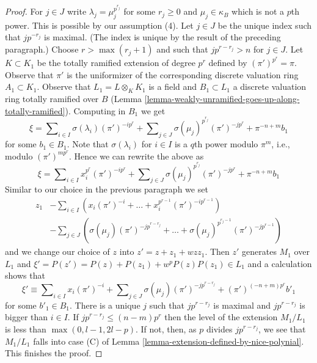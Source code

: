 \begin{proof}
\medskip\noindent
For $j \in J$ write $\lambda_j = \mu_j^{p^{r_j}}$ for some $r_j \geq 0$ and
$\mu_j \in \kappa_B$ which is not a $p$th power. This is possible by our
assumption (4). Let $j \in J$ be the unique index such that $j p^{-r_j}$
is maximal. (The index is unique by the result of the preceding paragraph.)
Choose $r > \max(r_j + 1)$ and such that $j p^{r - r_j} > n$ for $j \in J$.
Let $K \subset K_1$ be the totally ramified extension of degree $p^r$ defined
by $(\pi')^{p^r} = \pi$. Observe that $\pi'$ is the uniformizer of the
corresponding discrete valuation ring $A_1 \subset K_1$.
Observe that $L_1 = L \otimes_K K_1$ is a field and $B_1 \subset L_1$
a discrete valuation ring totally ramified over $B$
(Lemma \ref{lemma-weakly-unramified-goes-up-along-totally-ramified}).
Computing in $B_1$ we get
$$
\xi = \sum\nolimits_{i \in I} \sigma(\lambda_i) (\pi')^{-i p^r} +
\sum\nolimits_{j \in J} \sigma(\mu_j)^{p^{r_j}} (\pi')^{-j p^r} +
\pi^{-n + m} b_1
$$
for some $b_1 \in B_1$. Note that $\sigma(\lambda_i)$ for $i \in I$
is a $q$th power modulo $\pi^m$, i.e., modulo $(\pi')^{m p^r}$.
Hence we can rewrite the above as
$$
\xi = \sum\nolimits_{i \in I} x_i^{p^r} (\pi')^{-i p^r} +
\sum\nolimits_{j \in J} \sigma(\mu_j)^{p^{r_j}} (\pi')^{- j p^r}
+ \pi^{-n + m}b_1
$$
Similar to our choice in the previous paragraph we set
\begin{align*}
z_1 & - \sum\nolimits_{i \in I}
\left(x_i (\pi')^{-i} + \ldots + x_i^{p^{r - 1}} (\pi')^{-i p^{r - 1}}\right)
\\
& - \sum\nolimits_{j \in J}
\left(
\sigma(\mu_j) (\pi')^{- j p^{r - r_j}}
+ \ldots +
\sigma(\mu_j)^{p^{r_j - 1}} (\pi')^{- j p^{r - 1}}
\right)
\end{align*}
and we change our choice of $z$ into $z' = z + z_1 + wzz_1$.
Then $z'$ generates $M_1$ over $L_1$ and
$\xi' = P(z') = P(z) + P(z_1) + w^p P(z) P(z_1) \in L_1$
and a calculation shows that
$$
\xi' \equiv
\sum\nolimits_{i \in I} x_i (\pi')^{-i} +
\sum\nolimits_{j \in J} \sigma(\mu_j) (\pi')^{- j p^{r - r_j}} +
(\pi')^{(-n + m)p^r}b'_1
$$
for some $b'_1 \in B_1$. There is a unique $j$ such that $j p^{r - r_j}$
is maximal and $j p^{r - r_j}$ is bigger than $i \in I$. If
$j p^{r - r_j} \leq (n - m)p^r$ then the level of the extension $M_1/L_1$
is less than $\max(0, l - 1, 2l - p)$. If not, then, as $p$ divides
$j p^{r - r_j}$, we see that $M_1 / L_1$ falls into case (C) of
Lemma \ref{lemma-extension-defined-by-nice-polynial}.
This finishes the proof.
\end{proof}

